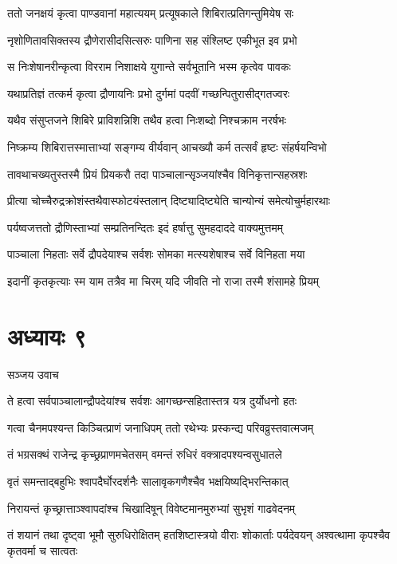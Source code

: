 \twolineshloka
{ततो जनक्षयं कृत्वा पाण्डवानां महात्ययम्}
{प्रत्यूषकाले शिबिरात्प्रतिगन्तुमियेष सः}


\twolineshloka
{नृशोणितावसिक्तस्य द्रौणेरासीदसित्सरुः}
{पाणिना सह संश्लिष्ट एकीभूत इव प्रभो}


\twolineshloka
{स निःशेषानरीन्कृत्वा विरराम निशाक्षये}
{युगान्ते सर्वभूतानि भस्म कृत्वेव पावकः}


\twolineshloka
{यथाप्रतिज्ञं तत्कर्म कृत्वा द्रौणायनिः प्रभो}
{दुर्गमां पदवीं गच्छन्पितुरासीद्गतज्वरः}


\twolineshloka
{यथैव संसुप्तजने शिबिरे प्राविशन्निशि}
{तथैव हत्वा निःशब्दो निश्चक्राम नरर्षभः}


\twolineshloka
{निष्क्रम्य शिबिरात्तस्मात्ताभ्यां सङ्गम्य वीर्यवान्}
{आचख्यौ कर्म तत्सर्वं हृष्टः संहर्षयन्विभो}


\twolineshloka
{तावथाचख्यतुस्तस्मै प्रियं प्रियकरौ तदा}
{पाञ्चालान्सृञ्जयांश्चैव विनिकृत्तान्सहस्रशः}


\twolineshloka
{प्रीत्या चोच्चैरुद्रक्रोशंस्तथैवास्फोटयंस्तलान्}
{दिष्ट्यादिष्ट्येति चान्योन्यं समेत्योचुर्महारथाः}


\twolineshloka
{पर्यष्वजत्ततो द्रौणिस्ताभ्यां सम्प्रतिनन्दितः}
{इदं हर्षात्तु सुमहदाददे वाक्यमुत्तमम्}


\twolineshloka
{पाञ्चाला निहताः सर्वे द्रौपदेयाश्च सर्वशः}
{सोमका मत्स्यशेषाश्च सर्वे विनिहता मया}


\twolineshloka
{इदानीं कृतकृत्याः स्म याम तत्रैव मा चिरम्}
{यदि जीवति नो राजा तस्मै शंसामहे प्रियम्}


\chapter{अध्यायः ९}
\twolineshloka
{सञ्जय उवाच}
{}


\twolineshloka
{ते हत्वा सर्वपाञ्चालान्द्रौपदेयांश्च सर्वशः}
{आगच्छन्सहितास्तत्र यत्र दुर्योधनो हतः}


\twolineshloka
{गत्वा चैनमपश्यन्त किञ्चित्प्राणं जनाधिपम्}
{ततो रथेभ्यः प्रस्कन्द्य परिवव्रुस्तवात्मजम्}


\twolineshloka
{तं भग्रसक्थं राजेन्द्र कृच्छ्रप्राणमचेतसम्}
{वमन्तं रुधिरं वक्त्रादपश्यन्वसुधातले}


\twolineshloka
{वृतं समन्ताद्बहुभिः श्वापदैर्घोरदर्शनैः}
{सालावृकगणैश्चैव भक्षयिष्यद्भिरन्तिकात्}


\twolineshloka
{निरायन्तं कृच्छ्रात्ताञ्श्वापदांश्च चिखादिषून्}
{विवेष्टमानमुरुभ्यां सुभृशं गाढवेदनम्}


\threelineshloka
{तं शयानं तथा दृष्ट्वा भूमौ सुरुधिरोक्षितम्}
{हतशिष्टास्त्रयो वीराः शोकार्ताः पर्यदेवयन्}
{अश्वत्थामा कृपश्चैव कृतवर्मा च सात्वतः}


